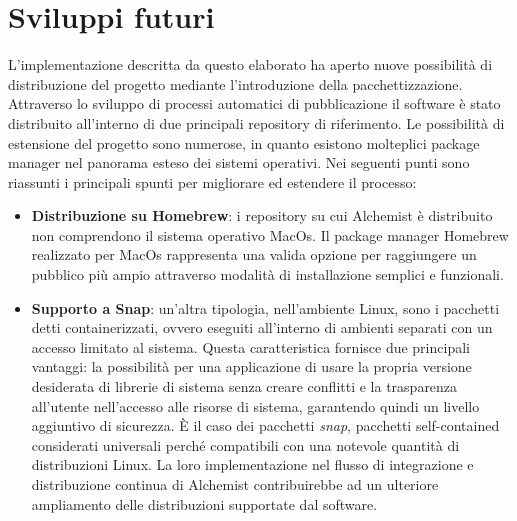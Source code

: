 \section{Sviluppi futuri}
L'implementazione descritta da questo elaborato ha aperto nuove possibilità di distribuzione del progetto mediante l'introduzione della pacchettizzazione. Attraverso lo sviluppo di processi automatici di pubblicazione il software è stato distribuito all'interno di due principali repository di riferimento. Le possibilità di estensione del progetto sono numerose, in quanto esistono molteplici package manager nel panorama esteso dei sistemi operativi. Nei seguenti punti sono riassunti i principali spunti per migliorare ed estendere il processo:
\begin{itemize}
	\item \textbf{Distribuzione su Homebrew}: i repository su cui Alchemist è distribuito non comprendono il sistema operativo MacOs. Il package manager Homebrew realizzato per MacOs rappresenta una valida opzione per raggiungere un pubblico più ampio attraverso modalità di installazione semplici e funzionali.
	\item \textbf{Supporto a Snap}: un'altra tipologia, nell'ambiente Linux, sono i pacchetti detti containerizzati, ovvero eseguiti all'interno di ambienti separati con un accesso limitato al sistema. Questa caratteristica fornisce due principali vantaggi: la possibilità per una applicazione di usare la propria versione desiderata di librerie di sistema senza creare conflitti e la trasparenza all'utente nell'accesso alle risorse di sistema, garantendo quindi un livello aggiuntivo di sicurezza. È il caso dei pacchetti \textit{snap}, pacchetti self-contained considerati universali perché compatibili con una notevole quantità di distribuzioni Linux. La loro implementazione nel flusso di integrazione e distribuzione continua di Alchemist contribuirebbe ad un ulteriore ampliamento delle distribuzioni supportate dal software. 
\end{itemize}
